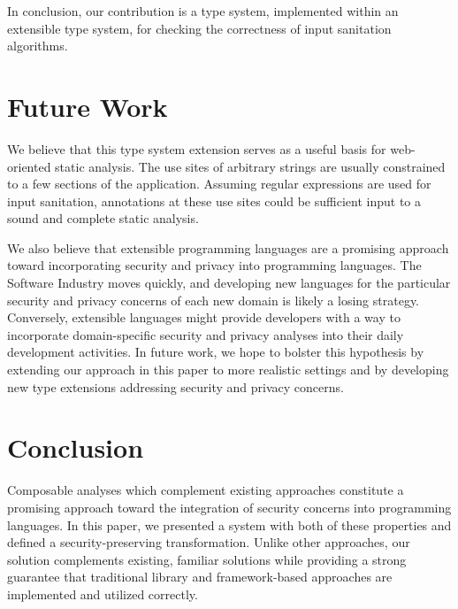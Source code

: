 \documentclass[9pt]{sig-alternate}
\theoremstyle{definition}
\begin{document}
In conclusion, our contribution is a type system, implemented within an extensible type system, for checking the correctness of input sanitation algorithms.

\section{Future Work}

We believe that this type system extension serves as a useful basis for web-oriented static analysis.
The use sites of arbitrary strings are usually constrained to a few sections of the application. Assuming
regular expressions are used for input sanitation, annotations at these use sites could be sufficient input to a sound and complete static analysis.

We also believe that extensible programming languages are a promising approach toward incorporating security
and privacy into programming languages. The Software Industry moves quickly, and developing new languages for 
the particular security and privacy concerns of each new domain is likely a losing strategy. Conversely, extensible
languages might provide developers with a way to incorporate domain-specific security and privacy analyses into their
daily development activities. In future work, we hope to bolster this hypothesis by extending our approach in this paper
to more realistic settings and by developing new type extensions addressing security and privacy concerns.

\section{Conclusion}


Composable analyses which complement existing approaches constitute a promising approach toward the integration of security concerns into programming languages.
In this paper, we presented a system with both of these properties and defined a security-preserving transformation.
Unlike other approaches, our solution complements existing, familiar solutions while providing a strong guarantee that traditional library and framework-based approaches are implemented and utilized correctly.


\end{document}
